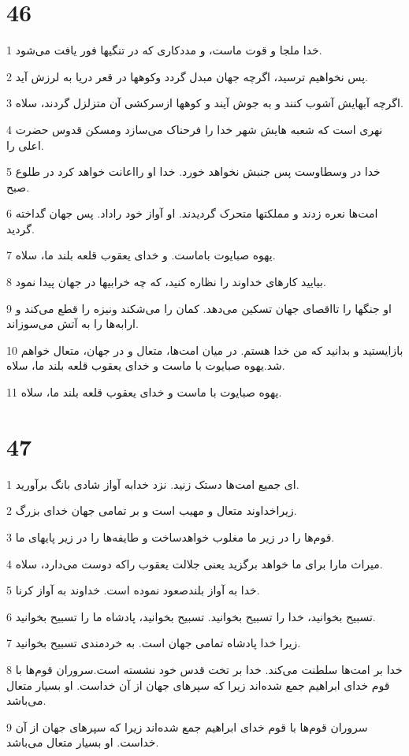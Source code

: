 \chapter{46}

\par 1 خدا ملجا و قوت ماست، و مددکاری که در تنگیها فور یافت می‌شود.
\par 2 پس نخواهیم ترسید، اگر‌چه جهان مبدل گردد وکوهها در قعر دریا به لرزش آید.
\par 3 اگر‌چه آبهایش آشوب کنند و به جوش آیند و کوهها ازسرکشی آن متزلزل گردند، سلاه.
\par 4 نهری است که شعبه هایش شهر خدا را فرحناک می‌سازد ومسکن قدوس حضرت اعلی را.
\par 5 خدا در وسطاوست پس جنبش نخواهد خورد. خدا او رااعانت خواهد کرد در طلوع صبح.
\par 6 امت‌ها نعره زدند و مملکتها متحرک گردیدند. او آواز خود راداد. پس جهان گداخته گردید.
\par 7 یهوه صبایوت باماست. و خدای یعقوب قلعه بلند ما، سلاه.
\par 8 بیایید کارهای خداوند را نظاره کنید، که چه خرابیها در جهان پیدا نمود.
\par 9 او جنگها را تااقصای جهان تسکین می‌دهد. کمان را می‌شکند ونیزه را قطع می‌کند و ارابه‌ها را به آتش می‌سوزاند.
\par 10 بازایستید و بدانید که من خدا هستم. در میان امت‌ها، متعال و در جهان، متعال خواهم شد.یهوه صبایوت با ماست و خدای یعقوب قلعه بلند ما، سلاه.
\par 11 یهوه صبایوت با ماست و خدای یعقوب قلعه بلند ما، سلاه.
 
\chapter{47}

\par 1 ای جمیع امت‌ها دستک زنید. نزد خدابه آواز شادی بانگ برآورید.
\par 2 زیراخداوند متعال و مهیب است و بر تمامی جهان خدای بزرگ.
\par 3 قوم‌ها را در زیر ما مغلوب خواهدساخت و طایفه‌ها را در زیر پایهای ما.
\par 4 میراث مارا برای ما خواهد برگزید یعنی جلالت یعقوب راکه دوست می‌دارد، سلاه.
\par 5 خدا به آواز بلندصعود نموده است. خداوند به آواز کرنا.
\par 6 تسبیح بخوانید، خدا را تسبیح بخوانید. تسبیح بخوانید، پادشاه ما را تسبیح بخوانید.
\par 7 زیرا خدا پادشاه تمامی جهان است. به خردمندی تسبیح بخوانید.
\par 8 خدا بر امت‌ها سلطنت می‌کند. خدا بر تخت قدس خود نشسته است.سروران قوم‌ها با قوم خدای ابراهیم جمع شده‌اند زیرا که سپرهای جهان از آن خداست. او بسیار متعال می‌باشد.
\par 9 سروران قوم‌ها با قوم خدای ابراهیم جمع شده‌اند زیرا که سپرهای جهان از آن خداست. او بسیار متعال می‌باشد.
 
